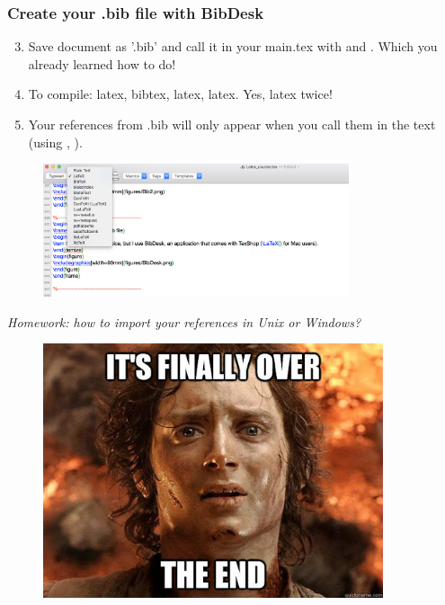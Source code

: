 \documentclass{beamer}
\begin{document}

\begin{frame}[fragile]
\frametitle{Create your .bib file with BibDesk}
\begin{enumerate}
  \setcounter{enumi}{2}
\item Save document as '.bib' and call it in your main.tex with \color{blue}{\verb||} \color{black}{} and \color{blue}{\verb||} \color{black}{}. Which you already learned how to do! \\
\item To compile: latex, bibtex, latex, latex. Yes, latex twice!
\item Your references from .bib will only appear when you call them in the text (using \color{blue}{\verb|\citep|} \color{black}{}, \color{blue}{\verb|\citet|} \color{black}{}). \\
\end{enumerate}
\begin{figure}
\includegraphics[width=90mm]{figures/compile.png}
\end{figure}
\vspace{0.5cm}
\textit{Homework: how to import your references in Unix or Windows?}
\end{frame}

\begin{frame}
\begin{figure}
\includegraphics[width=100mm]{figures/Frodo.jpeg}
\end{figure}
\end{frame}



\end{document}
